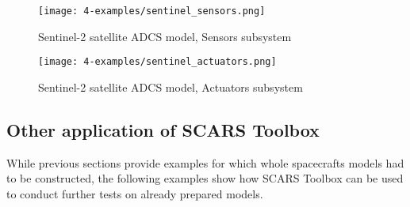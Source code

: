         \clearpage
        \begin{sidewaysfigure}
            \centering
            \texttt{[image: 4-examples/sentinel\_sensors.png]}
            \caption{Sentinel-2 satellite ADCS model, Sensors subsystem}
            \label{fig:sentinel_sensors}
        \end{sidewaysfigure}
        \clearpage
        \begin{sidewaysfigure}
            \centering
            \texttt{[image: 4-examples/sentinel\_actuators.png]}
            \caption{Sentinel-2 satellite ADCS model, Actuators subsystem}
            \label{fig:sentinel_actuators}
        \end{sidewaysfigure}
        \clearpage








\subsection{Other application of SCARS Toolbox}\label{sec:test_examples}
    While previous sections provide examples for which whole spacecrafts models had to be constructed, the following examples show how SCARS Toolbox can be used to conduct further tests on already prepared models. 

